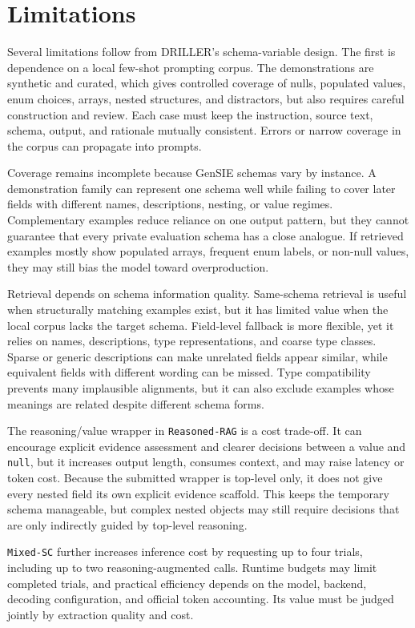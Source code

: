 \section{Limitations}

Several limitations follow from DRILLER's schema-variable design. The first is dependence on a local few-shot prompting corpus. The demonstrations are synthetic and curated, which gives controlled coverage of nulls, populated values, enum choices, arrays, nested structures, and distractors, but also requires careful construction and review. Each case must keep the instruction, source text, schema, output, and rationale mutually consistent. Errors or narrow coverage in the corpus can propagate into prompts.

Coverage remains incomplete because GenSIE schemas vary by instance. A demonstration family can represent one schema well while failing to cover later fields with different names, descriptions, nesting, or value regimes. Complementary examples reduce reliance on one output pattern, but they cannot guarantee that every private evaluation schema has a close analogue. If retrieved examples mostly show populated arrays, frequent enum labels, or non-null values, they may still bias the model toward overproduction.

Retrieval depends on schema information quality. Same-schema retrieval is useful when structurally matching examples exist, but it has limited value when the local corpus lacks the target schema. Field-level fallback is more flexible, yet it relies on names, descriptions, type representations, and coarse type classes. Sparse or generic descriptions can make unrelated fields appear similar, while equivalent fields with different wording can be missed. Type compatibility prevents many implausible alignments, but it can also exclude examples whose meanings are related despite different schema forms.

The reasoning/value wrapper in \texttt{Reasoned-RAG} is a cost trade-off. It can encourage explicit evidence assessment and clearer decisions between a value and \texttt{null}, but it increases output length, consumes context, and may raise latency or token cost. Because the submitted wrapper is top-level only, it does not give every nested field its own explicit evidence scaffold. This keeps the temporary schema manageable, but complex nested objects may still require decisions that are only indirectly guided by top-level reasoning.

\texttt{Mixed-SC} further increases inference cost by requesting up to four trials, including up to two reasoning-augmented calls. Runtime budgets may limit completed trials, and practical efficiency depends on the model, backend, decoding configuration, and official token accounting. Its value must be judged jointly by extraction quality and cost.

